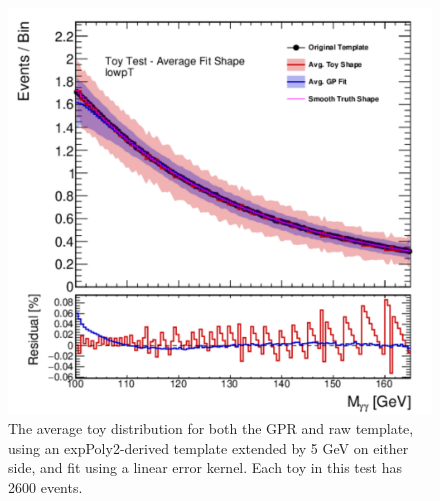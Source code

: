 \begin{figure} 
\begin{center}
  \includegraphics[width=\textwidth]{figures/background/gpr/validation/linear/ToyTest_AvgFitShape_lowpT_2600_noSig}   
\caption{The average toy distribution for both the GPR and raw template, using an expPoly2-derived template extended by 5 GeV on either side, and fit using a linear error kernel. Each toy in this test has 2600 events.}
\label{fig:linearkernel_lowpt_2600_noSig}
\end{center}
\end{figure}

